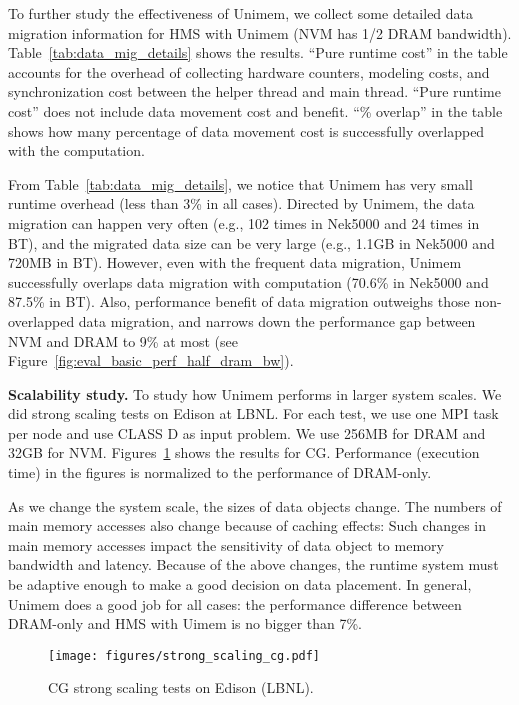 To further study the effectiveness of Unimem, we collect some detailed data migration information for HMS with Unimem (NVM has 1/2 DRAM bandwidth). Table~\ref{tab:data_mig_details} shows the results. ``Pure runtime cost'' in the table accounts for the overhead of collecting hardware counters, modeling costs, and synchronization cost between the helper thread and main thread.
``Pure runtime cost'' does not include data movement cost and benefit. ``\% overlap'' in the table shows how many percentage of data movement cost is successfully overlapped with the computation.

From Table~\ref{tab:data_mig_details}, we notice that Unimem has very small runtime overhead (less than 3\% in all cases). Directed by Unimem, the data migration can happen very often (e.g., 102 times in Nek5000 and 24 times in BT), and the migrated data size can be very large (e.g., 1.1GB in Nek5000 and 720MB in BT). However, even with the frequent data migration, Unimem successfully overlaps data migration with computation (70.6\% in Nek5000 and 87.5\% in BT). 
Also, performance benefit of data migration outweighs those non-overlapped data migration, and narrows down the performance gap between NVM and DRAM to 9\% at most (see Figure~\ref{fig:eval_basic_perf_half_dram_bw}).

\textbf{Scalability study.} 
To study how Unimem performs in larger system scales. We did
strong scaling tests on Edison at LBNL. For each test,
we use one MPI task per node and use CLASS D as input problem.
We use 256MB for DRAM and 32GB for NVM. 
Figures~\ref{fig:strong_scaling_cg} %
shows the results for CG. %
Performance (execution time) in the figures is normalized to the performance of DRAM-only.

As we change the system scale, the sizes of data objects
change. The numbers of main memory accesses also change because of caching effects: Such changes in main memory accesses impact the sensitivity of data object to memory bandwidth and latency.
Because of the above changes, the runtime system must be adaptive enough
to make a good decision on data placement. 
In general, Unimem does a good job for all cases: the
performance difference between DRAM-only and HMS with Uimem
is no bigger than 7\%. 

\begin{figure}[!t]
	\vspace*{5pt}
    \centering
    \texttt{[image: figures/strong\_scaling\_cg.pdf]}
    \vspace{-20pt}
    \caption{CG strong scaling tests on Edison (LBNL).}
    \label{fig:strong_scaling_cg}
    \vspace{-15pt}
\end{figure}

